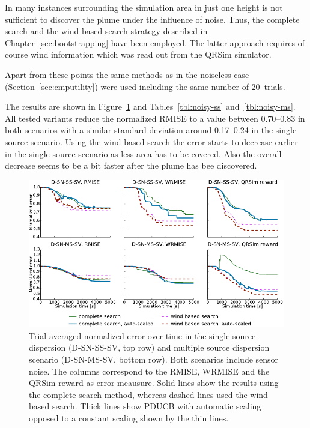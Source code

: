 In many instances surrounding the simulation area in just one height is not 
sufficient to discover the plume under the influence of noise. Thus, the 
complete search and the wind based search strategy described in 
Chapter~\ref{sec:bootstrapping} have been employed. The latter approach requires 
of course wind information which was read out from the QRSim simulator.

Apart from these points the same methods as in the noiseless case 
(Section~\ref{sec:cmputility}) were used including the same number of 20~trials.

The results are shown in Figure~\ref{fig:noisy-ss} and Tables~\ref{tbl:noisy-ss} 
and~\ref{tbl:noisy-ms}. All tested variants reduce the normalized RMISE to 
a value between \numrange{0.70}{0.83} in both scenarios with a similar standard 
deviation around \numrange{0.17}{0.24} in the single source scenario.  Using the 
wind based search the error starts to decrease earlier in the single source 
scenario as less area has to be covered.  Also the overall decrease seems to be 
a bit faster after the plume has bee discovered.

\begin{figure}
    \centering
    \includegraphics{plots/noisy-sv}
    \caption[Normalized error in sensor noise scenarios]{Trial averaged 
        normalized error over time in the single source dispersion (D-SN-SS-SV, 
        top row) and multiple source dispersion scenario (D-SN-MS-SV, bottom 
        row). Both scenarios include sensor noise.  The columns correspond to 
        the RMISE, WRMISE and the QRSim reward as error meausure.  Solid lines 
        show the results using the complete search method, whereas dashed lines 
        used the wind based search.  Thick lines show PDUCB with automatic 
        scaling opposed to a constant scaling shown by the thin 
        lines.}\label{fig:noisy-ss}
\end{figure}

